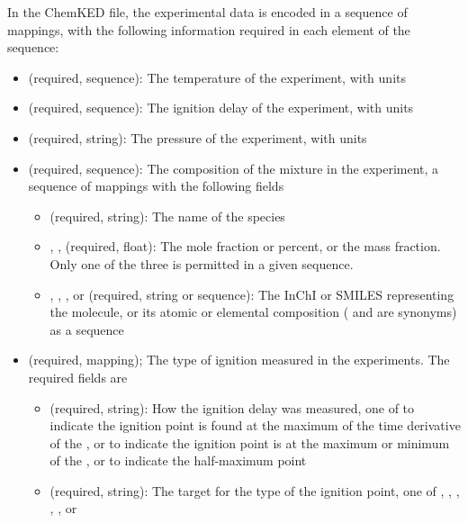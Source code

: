 \documentclass[12pt]{ussci}
\newcommand\ck{ChemKED}
\begin{document}
In the \ck{} file, the experimental data is encoded in a sequence of mappings,
with the following information required in each element of the sequence:
%
\begin{itemize}
    \item {} (required, sequence): The temperature of the
    experiment, with units
    \item {} (required, sequence): The ignition delay of the
    experiment, with units
    \item {} (required, string): The pressure of the experiment,
    with units
    \item {} (required, sequence): The composition of the
    mixture in the experiment, a sequence of mappings with the following fields
    \begin{itemize}
        \item {} (required, string): The name of the species
        \item {}, , 
        (required, float): The mole fraction or percent, or the mass fraction.
        Only one of the three is permitted in a given 
        sequence.
        \item {}, , , or
         (required, string or sequence): The InChI
        or SMILES representing the molecule, or its atomic or elemental
        composition ( and
         are synonyms) as a sequence
    \end{itemize}
    \item {} (required, mapping); The type of ignition
    measured in the experiments. The required fields are
    \begin{itemize}
        \item {} (required, string): How the ignition delay was
        measured, one of  to indicate the ignition point is
        found at the maximum of the time derivative of the ,
         or  to indicate the ignition point is at the
        maximum or minimum of the , or  to
        indicate the half-maximum point
        \item {} (required, string): The target for the type of the
        ignition point, one of , ,
        , , , or 
    \end{itemize}
\end{itemize}
\end{document}
